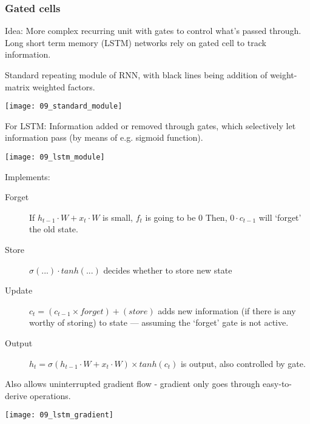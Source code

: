 \subsubsection{Gated cells}

Idea: More complex recurring unit with gates to control what's passed through.
Long short term memory (LSTM) networks rely on gated cell to track information.

Standard repeating module of RNN, with black lines being addition of
weight-matrix weighted factors.

\texttt{[image: 09\_standard\_module]}

For LSTM: Information added or removed through gates, which selectively let
information pass (by means of e.g. sigmoid function).

\texttt{[image: 09\_lstm\_module]}

Implements:
\begin{description}
		\item[Forget] If $h_{t-1} \cdot W + x_t \cdot W$ is small, $f_t$ is
				going to be $0$ Then, $0 \cdot c_{t-1}$ will `forget' the old
				state.
		\item[Store] $\sigma(...) \cdot tanh(...)$ decides whether to store new
				state
		\item[Update] $c_t = (c_{t-1} \times forget) + (store)$ adds new
				information (if there is any worthy of storing) to state ---
				assuming the `forget' gate is not active.
		\item[Output] $h_t = \sigma(h_{t-1} \cdot W + x_t \cdot W) \times
				tanh(c_t)$ is output, also controlled by gate.
\end{description}

Also allows uninterrupted gradient flow - gradient only goes through
easy-to-derive operations.

\texttt{[image: 09\_lstm\_gradient]}
